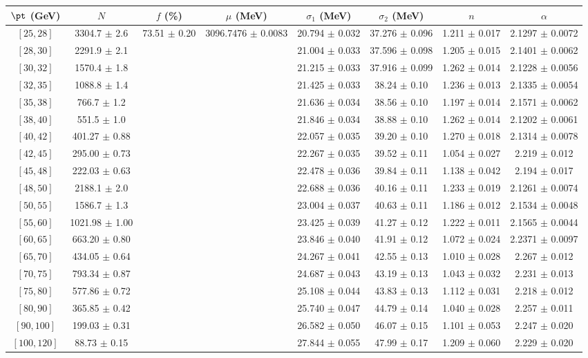 \begin{tabular}{c||c|c|c|c|c|c|c}
$\pt$ (GeV) & $N$ & $f$ (\%) & $\mu$ (MeV) & $\sigma_1$ (MeV) & $\sigma_2$ (MeV) & $n$ & $\alpha$ \\
\hline
$[25, 28]$ & 3304.7 $\pm$ 2.6 & \multirow{19}{*}{73.51 $\pm$ 0.20} & \multirow{19}{*}{3096.7476 $\pm$ 0.0083} & 20.794 $\pm$ 0.032 & 37.276 $\pm$ 0.096 & 1.211 $\pm$ 0.017 & 2.1297 $\pm$ 0.0072\\
$[28, 30]$ & 2291.9 $\pm$ 2.1 &  &  & 21.004 $\pm$ 0.033 & 37.596 $\pm$ 0.098 & 1.205 $\pm$ 0.015 & 2.1401 $\pm$ 0.0062\\
$[30, 32]$ & 1570.4 $\pm$ 1.8 &  &  & 21.215 $\pm$ 0.033 & 37.916 $\pm$ 0.099 & 1.262 $\pm$ 0.014 & 2.1228 $\pm$ 0.0056\\
$[32, 35]$ & 1088.8 $\pm$ 1.4 &  &  & 21.425 $\pm$ 0.033 & 38.24 $\pm$ 0.10 & 1.236 $\pm$ 0.013 & 2.1335 $\pm$ 0.0054\\
$[35, 38]$ & 766.7 $\pm$ 1.2 &  &  & 21.636 $\pm$ 0.034 & 38.56 $\pm$ 0.10 & 1.197 $\pm$ 0.014 & 2.1571 $\pm$ 0.0062\\
$[38, 40]$ & 551.5 $\pm$ 1.0 &  &  & 21.846 $\pm$ 0.034 & 38.88 $\pm$ 0.10 & 1.262 $\pm$ 0.014 & 2.1202 $\pm$ 0.0061\\
$[40, 42]$ & 401.27 $\pm$ 0.88 &  &  & 22.057 $\pm$ 0.035 & 39.20 $\pm$ 0.10 & 1.270 $\pm$ 0.018 & 2.1314 $\pm$ 0.0078\\
$[42, 45]$ & 295.00 $\pm$ 0.73 &  &  & 22.267 $\pm$ 0.035 & 39.52 $\pm$ 0.11 & 1.054 $\pm$ 0.027 & 2.219 $\pm$ 0.012\\
$[45, 48]$ & 222.03 $\pm$ 0.63 &  &  & 22.478 $\pm$ 0.036 & 39.84 $\pm$ 0.11 & 1.138 $\pm$ 0.042 & 2.194 $\pm$ 0.017\\
$[48, 50]$ & 2188.1 $\pm$ 2.0 &  &  & 22.688 $\pm$ 0.036 & 40.16 $\pm$ 0.11 & 1.233 $\pm$ 0.019 & 2.1261 $\pm$ 0.0074\\
$[50, 55]$ & 1586.7 $\pm$ 1.3 &  &  & 23.004 $\pm$ 0.037 & 40.63 $\pm$ 0.11 & 1.186 $\pm$ 0.012 & 2.1534 $\pm$ 0.0048\\
$[55, 60]$ & 1021.98 $\pm$ 1.00 &  &  & 23.425 $\pm$ 0.039 & 41.27 $\pm$ 0.12 & 1.222 $\pm$ 0.011 & 2.1565 $\pm$ 0.0044\\
$[60, 65]$ & 663.20 $\pm$ 0.80 &  &  & 23.846 $\pm$ 0.040 & 41.91 $\pm$ 0.12 & 1.072 $\pm$ 0.024 & 2.2371 $\pm$ 0.0097\\
$[65, 70]$ & 434.05 $\pm$ 0.64 &  &  & 24.267 $\pm$ 0.041 & 42.55 $\pm$ 0.13 & 1.010 $\pm$ 0.028 & 2.267 $\pm$ 0.012\\
$[70, 75]$ & 793.34 $\pm$ 0.87 &  &  & 24.687 $\pm$ 0.043 & 43.19 $\pm$ 0.13 & 1.043 $\pm$ 0.032 & 2.231 $\pm$ 0.013\\
$[75, 80]$ & 577.86 $\pm$ 0.72 &  &  & 25.108 $\pm$ 0.044 & 43.83 $\pm$ 0.13 & 1.112 $\pm$ 0.031 & 2.218 $\pm$ 0.012\\
$[80, 90]$ & 365.85 $\pm$ 0.42 &  &  & 25.740 $\pm$ 0.047 & 44.79 $\pm$ 0.14 & 1.040 $\pm$ 0.028 & 2.257 $\pm$ 0.011\\
$[90, 100]$ & 199.03 $\pm$ 0.31 &  &  & 26.582 $\pm$ 0.050 & 46.07 $\pm$ 0.15 & 1.101 $\pm$ 0.053 & 2.247 $\pm$ 0.020\\
$[100, 120]$ & 88.73 $\pm$ 0.15 &  &  & 27.844 $\pm$ 0.055 & 47.99 $\pm$ 0.17 & 1.209 $\pm$ 0.060 & 2.229 $\pm$ 0.020\\
\end{tabular}
